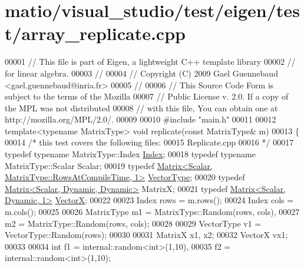 \hypertarget{matio_2visual__studio_2test_2eigen_2test_2array__replicate_8cpp_source}{}\section{matio/visual\+\_\+studio/test/eigen/test/array\+\_\+replicate.cpp}
\label{matio_2visual__studio_2test_2eigen_2test_2array__replicate_8cpp_source}

\begin{DoxyCode}
00001 \textcolor{comment}{// This file is part of Eigen, a lightweight C++ template library}
00002 \textcolor{comment}{// for linear algebra.}
00003 \textcolor{comment}{//}
00004 \textcolor{comment}{// Copyright (C) 2009 Gael Guennebaud <gael.guennebaud@inria.fr>}
00005 \textcolor{comment}{//}
00006 \textcolor{comment}{// This Source Code Form is subject to the terms of the Mozilla}
00007 \textcolor{comment}{// Public License v. 2.0. If a copy of the MPL was not distributed}
00008 \textcolor{comment}{// with this file, You can obtain one at http://mozilla.org/MPL/2.0/.}
00009 
00010 \textcolor{preprocessor}{#include "main.h"}
00011 
00012 \textcolor{keyword}{template}<\textcolor{keyword}{typename} MatrixType> \textcolor{keywordtype}{void} replicate(\textcolor{keyword}{const} MatrixType& m)
00013 \{
00014   \textcolor{comment}{/* this test covers the following files:}
00015 \textcolor{comment}{     Replicate.cpp}
00016 \textcolor{comment}{  */}
00017   \textcolor{keyword}{typedef} \textcolor{keyword}{typename} MatrixType::Index \hyperlink{namespace_eigen_a62e77e0933482dafde8fe197d9a2cfde}{Index};
00018   \textcolor{keyword}{typedef} \textcolor{keyword}{typename} MatrixType::Scalar Scalar;
00019   \textcolor{keyword}{typedef} \hyperlink{group___core___module_class_eigen_1_1_matrix}{Matrix<Scalar, MatrixType::RowsAtCompileTime, 1>} 
      \hyperlink{struct_vector_type}{VectorType};
00020   \textcolor{keyword}{typedef} \hyperlink{group___core___module}{Matrix<Scalar, Dynamic, Dynamic>} MatrixX;
00021   \textcolor{keyword}{typedef} \hyperlink{group___core___module}{Matrix<Scalar, Dynamic, 1>} \hyperlink{group___core___module}{VectorX};
00022 
00023   Index rows = m.rows();
00024   Index cols = m.cols();
00025 
00026   MatrixType m1 = MatrixType::Random(rows, cols),
00027              m2 = MatrixType::Random(rows, cols);
00028 
00029   VectorType v1 = VectorType::Random(rows);
00030 
00031   MatrixX x1, x2;
00032   VectorX vx1;
00033 
00034   \textcolor{keywordtype}{int}  f1 = internal::random<int>(1,10),
00035        f2 = internal::random<int>(1,10);

\end{DoxyCode}
